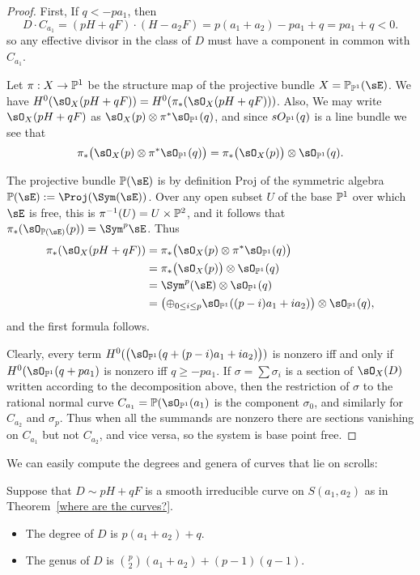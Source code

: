 \begin{proof} First, If $q<-pa_{1}$, then 
$$
D\cdot C_{a_{1}} = (pH+qF) \cdot (H-a_{2}F) = p(a_{1}+a_{2}) -pa_{1}+q = pa_{1}+q < 0.
$$
so any effective divisor in the class of $D$ must have a component in common with $C_{a_{1}}$.

Let $\pi:X\to \PP^{1}$ be the structure map of the projective bundle $X = \PP_{\PP^{1}}(\sE)$.
We have $H^{0}(\sO_{X}(pH+qF)) = H^{0}(\pi_{*}(\sO_{X}(pH+qF)))$. Also, 
We may write $\sO_{X}(pH+qF)$ as $\sO_{X}(p) \otimes \pi^{*}\sO_{\PP^{1}}(q)$, and since
$sO_{\PP^{1}}(q)$ is a line bundle we see that 
$$
\pi_{*}\bigl(\sO_{X}(p) \otimes \pi^{*}\sO_{\PP^{1}}(q)\bigr) 
 = \pi_{*}\bigl(\sO_{X}(p)\bigr)\otimes \sO_{\PP^{1}}(q).
$$

The projective bundle $\PP(\sE)$ is
by definition Proj of the symmetric algebra $\PP(\sE):=\Proj(\Sym(\sE))$. Over any open 
subset $U$ of the base $\PP^1$ over which $\sE$ is free, this is $\pi^{-1}(U) = U\times \PP^2$,
and it follows that $\pi_*(\sO_{\PP(\sE)}(p)) = \Sym^p\sE$. 
Thus 
\begin{align*}
\pi_{*}(\sO_{X}(pH+qF)) &= 
\pi_{*}\bigl(\sO_{X}(p) \otimes \pi^{*}\sO_{\PP^{1}}(q)\bigr) \\
 &= \pi_{*}\bigl(\sO_{X}(p)\bigr)\otimes \sO_{\PP^{1}}(q)\\
&=  \Sym^{p}(\sE)\otimes \sO_{\PP^{1}}(q)\\
&=  \bigl(\oplus_{0\leq i\leq p} \sO_{\PP^{1}}((p-i)a_{1}+i a_{2})\bigr) \otimes \sO_{\PP^{1}}(q),
\end{align*}
and the first formula follows. 

Clearly, every term 
$H^{0}(\bigl(\sO_{\PP^{1}}(q + (p-i)a_{1}+i a_{2})\bigr))$ is nonzero iff and only if 
$H^{0}(\sO_{\PP^{1}}(q + pa_{1})$ is nonzero iff $q\geq -pa_{1}$.
If $\sigma = \sum \sigma_i$ is a section of $\sO_X(D)$ written according to the decomposition
above, then the restriction of $\sigma$ to  the rational normal curve $C_{a_1} = \PP(\sO_{\PP^1}(a_1)$ is the component $\sigma_0$, and similarly for $C_{a_2}$ and $\sigma_p$. Thus when  all the summands are nonzero
there are sections  vanishing on $C_{a_{1}}$ but not $C_{a_{2}}$, and vice versa, so the system is base point free. 
\end{proof}

 
We can easily compute the degrees and genera of curves that lie on scrolls:

\begin{proposition}
 Suppose that $D\sim pH+qF$ is a smooth irreducible curve on $S(a_{1}, a_{2})$ as in Theorem~\ref{where are the curves?}. 
\begin{itemize}
 \item The degree of $D$ is $p(a_{1}+a_{2}) +q$.
 \item The genus of $D$ is ${p\choose 2}(a_{1}+a_{2}) + (p-1)(q-1)$.
\end{itemize}
\end{proposition}
  
